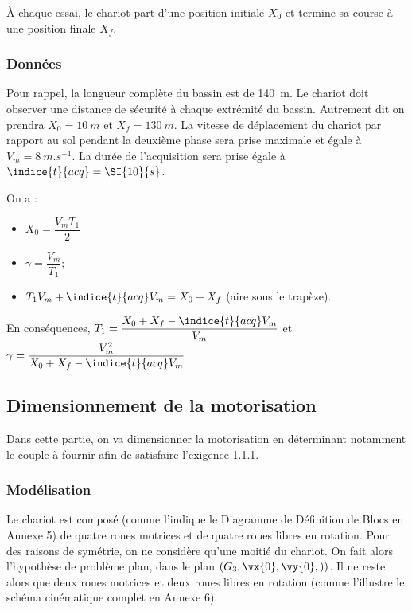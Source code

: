 À chaque essai, le chariot part d'une position initiale $X_0$ et termine sa course à une position finale $X_f$.
\subsubsection*{Données}
Pour rappel, la longueur complète du bassin est de \SI{140}{m}. Le chariot doit observer une distance de sécurité à chaque extrémité du bassin. Autrement dit on prendra $X_0=\SI{10}{m}$ et $X_f=\SI{130}{m}$.
La vitesse de déplacement du chariot par rapport au sol pendant la deuxième phase sera prise maximale et égale à $V_m=\SI{8}{m.s^{-1}}$. La durée de l'acquisition sera prise égale à $\indice{t}{acq}=\SI{10}{s}$.


\ifprof
\begin{corrige}
On a :
\begin{itemize}
\item $X_0 = \dfrac{V_m T_1}{2}$
\item $\gamma = \dfrac{V_m}{T_1}$; 
\item $T_1 V_m + \indice{t}{acq}V_m = X_0 + X_f$ (aire sous le trapèze). 
\end{itemize}
En conséquences, $T_1   =\dfrac{X_0 + X_f -  \indice{t}{acq}V_m}{V_m}$ et 
$\gamma= \dfrac{V_m^2}{X_0 + X_f -  \indice{t}{acq}V_m}$

\end{corrige}
\else
\fi

\subsection{Dimensionnement de la motorisation}
Dans cette partie, on va dimensionner la motorisation en déterminant notamment le couple à fournir afin de satisfaire l’exigence 1.1.1.
\subsubsection{Modélisation}
Le chariot est composé (comme l'indique le Diagramme de Définition de Blocs en Annexe 5) de quatre roues motrices et de quatre roues libres en rotation. Pour des raisons de symétrie, on ne considère qu'une moitié du chariot. On fait alors l’hypothèse de problème plan, dans le plan $\left(G_3,\vx{0},\vy{0}, )\right)$. Il ne reste alors que deux roues motrices et deux roues libres en rotation (comme l’illustre le schéma cinématique complet en Annexe 6).

